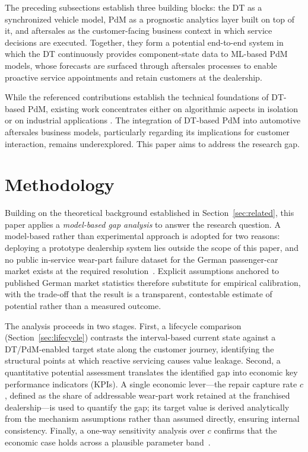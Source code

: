 \documentclass[conference,a4paper]{IEEEtran}
\begin{document}
The preceding subsections establish three building blocks: the DT as a synchronized vehicle model, PdM as a prognostic analytics layer built on top of it, and aftersales as the customer-facing business context in which service decisions are executed. Together, they form a potential end-to-end system in which the DT continuously provides component-state data to ML-based PdM models, whose forecasts are surfaced through aftersales processes to enable proactive service appointments and retain customers at the dealership.

While the referenced contributions establish the technical foundations of DT-based PdM, existing work concentrates either on algorithmic aspects in isolation \cite{kumar2025suspension,abougrad2026xai} or on industrial applications \cite{wang2023review}. The integration of DT-based PdM into automotive aftersales business models, particularly regarding its implications for customer interaction, remains underexplored. This paper aims to address the research gap.
\section{Methodology}

Building on the theoretical background established in Section~\ref{sec:related},
this paper applies a \emph{model-based gap analysis} to answer the research question.
A model-based rather than experimental approach is adopted for two reasons:
deploying a prototype dealership system lies outside the scope of this paper,
and no public in-service wear-part failure dataset for the German passenger-car
market exists at the required resolution~\cite{abougrad2026xai}. Explicit
assumptions anchored to published German market statistics therefore substitute
for empirical calibration, with the trade-off that the result is a transparent,
contestable estimate of potential rather than a measured outcome.

The analysis proceeds in two stages. First, a lifecycle comparison
(Section~\ref{sec:lifecycle}) contrasts the interval-based current state against
a DT/PdM-enabled target state along the customer journey, identifying the
structural points at which reactive servicing causes value leakage. Second, a
quantitative potential assessment translates the identified gap into economic
key performance indicators (KPIs). A single economic lever---the repair capture rate $c$, defined as the share of
addressable wear-part work retained at the franchised dealership---is used to
quantify the gap; its target value is derived analytically from the mechanism
assumptions rather than assumed directly, ensuring internal consistency. Finally, a
one-way sensitivity analysis over $c$ confirms that the economic case holds
across a plausible parameter band~\cite{cooper_gap_2015}.
\end{document}
